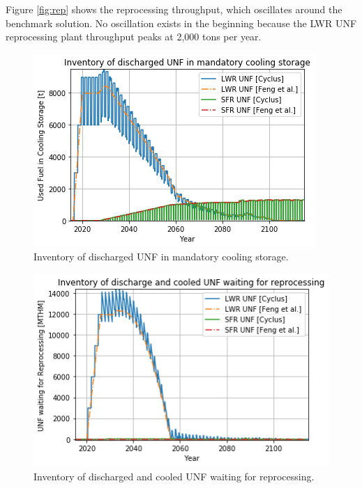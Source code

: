 \documentclass{article}
\begin{document}
Figure \ref{fig:rep} shows the reprocessing throughput, which oscillates around
the benchmark solution. No oscillation exists in the beginning because the
\gls{LWR} \gls{UNF} reprocessing plant throughput peaks at 2,000 tons per year.


\begin{figure}[htbp!]
    \begin{center}
            \includegraphics[width=\textwidth]{./fuel_discharge_monthly.png}
    \end{center}
        \caption{Inventory of discharged \gls{UNF} in mandatory cooling storage.}
    \label{fig:fuel_discharge_monthly}
\end{figure}


\begin{figure}[htbp!]
    \begin{center}
            \includegraphics[width=\textwidth]{./waiting_monthly.png}
    \end{center}
        \caption{Inventory of discharged and cooled \gls{UNF} waiting for reprocessing.}
    \label{fig:waiting_monthly}
\end{figure}
\end{document}
